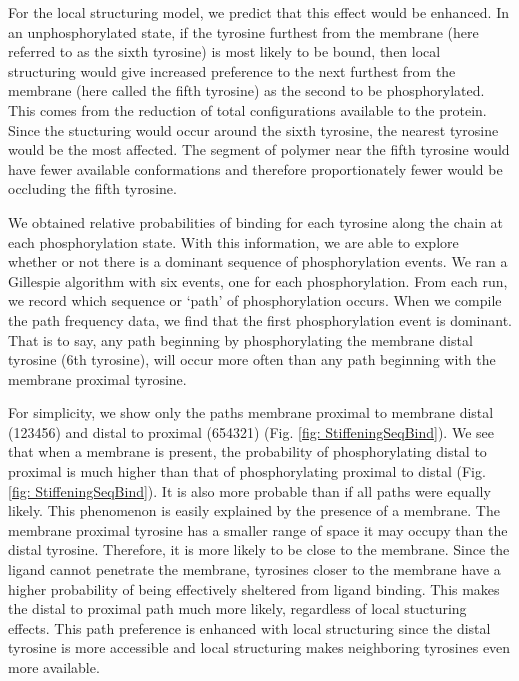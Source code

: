 \documentclass[../../AdvancementSummary.tex]{subfiles}
\begin{document}
For the local structuring model, we predict that this effect would be enhanced. In an unphosphorylated state, if the tyrosine furthest from the membrane (here referred to as the sixth tyrosine) is most likely to be bound, then local structuring would give increased preference to the next furthest from the membrane (here called the fifth tyrosine) as the second to be phosphorylated. This comes from the reduction of total configurations available to the protein. Since the stucturing would occur around the sixth tyrosine, the nearest tyrosine would be the most affected. The segment of polymer near the fifth tyrosine would have fewer available conformations and therefore proportionately fewer would be occluding the fifth tyrosine.

We obtained relative probabilities of binding for each tyrosine along the chain at each phosphorylation state. With this information, we are able to explore whether or not there is a dominant sequence of phosphorylation events. We ran a Gillespie algorithm \cite{Gillespie1977} with six events, one for each phosphorylation. From each run, we record which sequence or `path' of phosphorylation occurs. When we compile the path frequency data, we find that the first phosphorylation event is dominant. That is to say, any path beginning by phosphorylating the membrane distal tyrosine (6th tyrosine), will occur more often than any path beginning with the membrane proximal tyrosine. 

For simplicity, we show only the paths membrane proximal to membrane distal (123456) and distal to proximal (654321) (Fig. \ref{fig: StiffeningSeqBind}). We see that when a membrane is present, the probability of phosphorylating distal to proximal is much higher than that of phosphorylating proximal to distal (Fig. \ref{fig: StiffeningSeqBind}). It is also more probable than if all paths were equally likely. This phenomenon is easily explained by the presence of a membrane. The membrane proximal tyrosine has a smaller range of space it may occupy than the distal tyrosine. Therefore, it is more likely to be close to the membrane. Since the ligand cannot penetrate the membrane, tyrosines closer to the membrane have a higher probability of being effectively sheltered from ligand binding. This makes the distal to proximal path much more likely, regardless of local stucturing effects. This path preference is enhanced with local structuring since the distal tyrosine is more accessible and local structuring makes neighboring tyrosines even more available.
\end{document}

